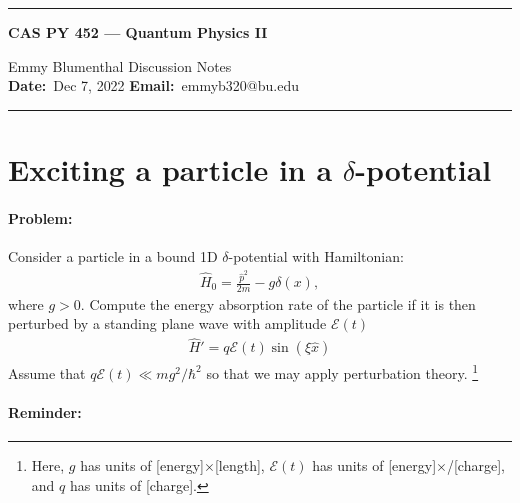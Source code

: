 \documentclass[10pt]{article}
\newcommand{\1}{\mathbf 1}
\begin{document}
\begin{center}
	\hrule
	\vspace{.4cm}
	{\textbf { \large CAS PY 452 --- Quantum Physics II}}
\end{center}
 Emmy Blumenthal \hspace{\fill} \hspace{\fill}  \textbf{} Discussion Notes\  \\
\textbf{Date:}\  Dec 7, 2022   \hspace{\fill} \textbf{Email:}\ emmyb320@bu.edu 
\vspace{.4cm}
\hrule

\section*{Exciting a particle in a $\delta$-potential}

\paragraph{Problem:}

Consider a particle in a bound 1D $\delta$-potential with Hamiltonian:
\begin{align}
	\hat H_0 = \frac{\hat p^2}{2m} - g \delta(x),
\end{align}
where $g> 0$.
Compute the energy absorption rate of the particle if it is then perturbed by a standing plane wave with amplitude $\mathcal{E}(t)$
\begin{align}
	\hat H' = q \mathcal{E}(t) \sin(\xi \hat x )
\end{align}
Assume that $q \mathcal{E}(t) \ll m g^2/\hbar^2 $ so that we may apply perturbation theory.
\footnote{Here, $g$ has units of [energy]$\times$[length], $\mathcal{E}(t)$ has units of [energy]$\times$/[charge], and $q$ has units of [charge].}

\paragraph{Reminder:}
\end{document}
